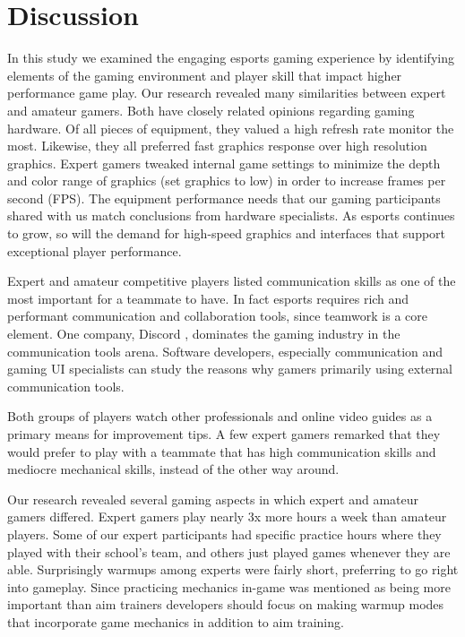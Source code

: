 \documentclass[11pt,manuscript,screen,review]{acmart} %
\begin{document}
\section{Discussion}

In this study we examined the engaging esports gaming experience by identifying elements of the gaming environment and player skill that impact higher performance game play. Our research revealed many similarities between expert and amateur gamers. Both have closely related opinions regarding gaming hardware. Of all pieces of equipment, they valued a high refresh rate monitor the most. Likewise, they all preferred fast graphics response over high resolution graphics. Expert gamers tweaked internal game settings to minimize the depth and color range of graphics (set graphics to low) in order to increase frames per second (FPS). The equipment performance needs that our gaming participants shared with us match conclusions from hardware specialists. \cite{spjut2021} As esports continues to grow, so will the demand for high-speed graphics and interfaces that support exceptional player performance. 

Expert and amateur competitive players listed communication skills as one of the most important for a teammate to have. In fact esports requires rich and performant communication and collaboration tools, since teamwork is a core element. One company, Discord \cite{discord}, dominates the gaming industry in the communication tools arena. Software developers, especially communication and gaming UI specialists can study the reasons why gamers primarily using external communication tools.  

Both groups of players watch other professionals and online video guides as a primary means for improvement tips. A few expert gamers remarked that they would prefer to play with a teammate that has high communication skills and mediocre mechanical skills, instead of the other way around. 

Our research revealed several gaming aspects in which expert and amateur gamers differed. Expert gamers play nearly 3x more hours a week than amateur players. Some of our expert participants had specific practice hours where they played with their school's team, and others just played games whenever they are able. Surprisingly warmups among experts were fairly short, preferring to go right into gameplay. Since practicing mechanics in-game was mentioned as being more important than aim trainers developers should focus on making warmup modes that incorporate game mechanics in addition to aim training. 
\end{document}
